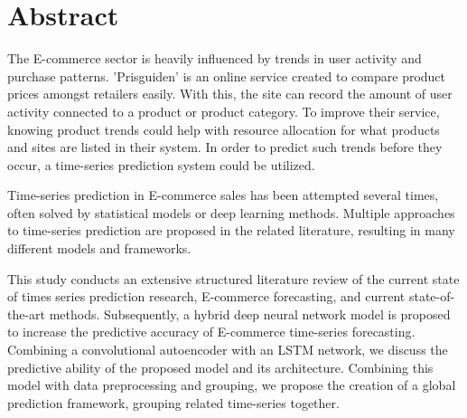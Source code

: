 \section*{Abstract}
\label{section:Abstract}

The E-commerce sector is heavily influenced by trends in user activity and purchase patterns.
'Prisguiden' is an online service created to compare product prices amongst retailers easily.
With this, the site can record the amount of user activity connected to a product or product category.
To improve their service, knowing product trends could help with resource allocation for what products and sites are listed in their system.
In order to predict such trends before they occur, a time-series prediction system could be utilized.

Time-series prediction in E-commerce sales has been attempted several times,
often solved by statistical models or deep learning methods.
Multiple approaches to time-series prediction are proposed in the related literature,
resulting in many different models and frameworks.

This study conducts an extensive structured literature review of the current state of times series prediction research, E-commerce forecasting,
and current state-of-the-art methods.
Subsequently, a hybrid deep neural network model is proposed to increase the predictive accuracy of E-commerce time-series forecasting.
Combining a convolutional autoencoder with an LSTM network, we discuss the predictive ability of the proposed model
and its architecture.
Combining this model with data preprocessing and grouping, we propose the creation of a global prediction framework,
grouping related time-series together.


